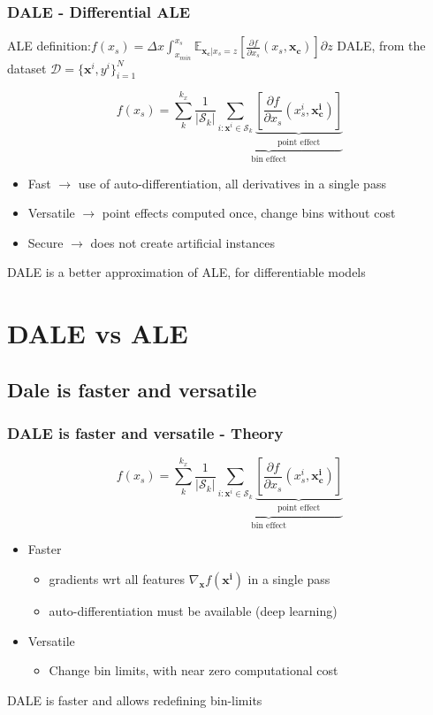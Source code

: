 \documentclass{beamer}
\newcommand{\xb}{\boldsymbol{x}}
\begin{document}
\begin{frame}
  \frametitle{DALE - Differential ALE}
  ALE definition:\(f(x_s) = \Delta x \int_{x_{min}}^{x_s}\mathbb{E}_{\mathbf{x_c}|x_s=z}[ \frac{\partial f}{\partial x_s}(x_s, \mathbf{x_c})] \partial z\)
  \noindent\makebox[\linewidth]{\rule{\paperwidth}{0.4pt}}
  DALE, from the dataset \(\mathcal{D} = { \{\mathbf{x}^i, y^i}\}_{i=1}^N\)

    \[f(x_s) = \sum_k^{k_x} \underbrace{\frac{1}{|\mathcal{S}_k|} \sum_{i:\xb^i \in \mathcal{S}_k} \underbrace{[\frac{\partial f}{\partial x_s}(x_s^i, \mathbf{x^i_c})]}_{\text{point effect}}}_{\text{bin effect}} \]

    \begin{itemize}
    \item Fast \( \rightarrow \) use of auto-differentiation, all derivatives in a single pass
    \item Versatile \( \rightarrow\) point effects computed once, change bins without cost
    \item Secure \( \rightarrow\) does not create artificial instances
    \end{itemize}

  \noindent\makebox[\linewidth]{\rule{\paperwidth}{0.4pt}}
  DALE is a better approximation of ALE, for \alert{differentiable} models
\end{frame}



\section{DALE vs ALE}

\subsection{Dale is faster and versatile}

\begin{frame}
  \frametitle{DALE is faster and versatile - Theory}
    \[f(x_s) = \sum_k^{k_x} \underbrace{\frac{1}{|\mathcal{S}_k|} \sum_{i:\xb^i \in \mathcal{S}_k} \underbrace{[\frac{\partial f}{\partial x_s}(x_s^i, \mathbf{x^i_c})]}_{\text{point effect}}}_{\text{bin effect}} \]

  \begin{itemize}
  \item Faster
    \begin{itemize}
      \item gradients wrt all features \(\nabla_{\mathbf{x}} f(\mathbf{x^i})\) in a single pass
      \item auto-differentiation must be available (deep learning)
    \end{itemize}
  \item Versatile
    \begin{itemize}
    \item Change bin limits, with near zero computational cost
    \end{itemize}

  \end{itemize}
  \noindent\makebox[\linewidth]{\rule{\paperwidth}{0.4pt}}
  DALE is faster and allows redefining bin-limits
\end{frame}
\end{document}
